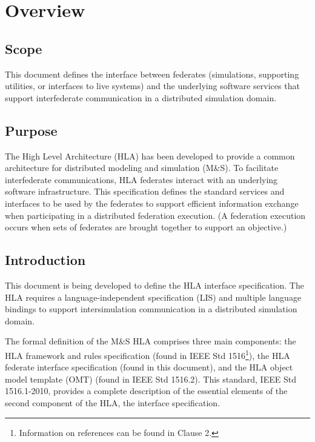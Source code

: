 \thispagestyle{firstbody}
\vspace*{0.62in}

\vspace{0.28in}
\section{Overview}

\subsection{Scope}

This document defines the interface between federates (simulations, supporting utilities, or interfaces to live systems) and the underlying software services that support interfederate communication in a distributed simulation domain.

\subsection{Purpose}

The High Level Architecture (HLA) has been developed to provide a common architecture for distributed modeling and simulation (M\&S). To facilitate interfederate communications, HLA federates interact with an underlying software infrastructure. This specification defines the standard services and interfaces to be used by the federates to support efficient information exchange when participating in a distributed federation execution. (A federation execution occurs when sets of federates are brought together to support an objective.)

\clearpage

\subsection{Introduction}

This document is being developed to define the HLA interface specification. The HLA requires a language-independent specification (LIS) and multiple language bindings to support intersimulation communication in a distributed simulation domain.

The formal definition of the M\&S HLA comprises three main components: the HLA framework and rules specification (found in IEEE Std 1516\footnote{Information on references can be found in Clause 2.}), the HLA federate interface specification (found in this document), and the HLA object model template (OMT) (found in IEEE Std 1516.2). This standard, IEEE Std 1516.1-2010, provides a complete description of the essential elements of the second component of the HLA, the interface specification.

